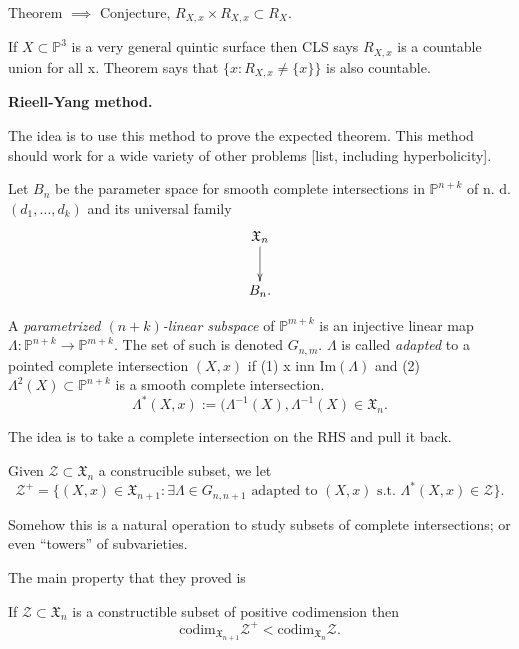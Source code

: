 Theorem $\implies $ Conjecture,
$R_{X,x} \times R_{X,x} \subset R_X$.

\begin{example}
\label{example-very-general-ci}
If $X \subset \mathbb{P}^3$ is a 
very general quintic surface then CLS says
$R_{X,x}$ is a countable union for all x.
Theorem says that $\{x: R_{X,x}\neq \{x\}\}$
is also countable.
\end{example}

\medskip\noindent
{\bf Rieell-Yang method.}

\noindent
The idea is to use this method to 
prove the expected theorem.
This method should work for a wide
variety of other problems [list, including
hyperbolicity].

Let $B_n$ be the parameter space
for smooth complete intersections
in $\mathbb{P}^{n+k}$ of n. d.
$(d_1,…,d_k)$ and its universal family
$$
\xymatrix{
\mathfrak{X}_n\ar[d]\\
B_n.
}
$$

\begin{definition}
\label{definition-parametrized-lin-subsp}
A {\it parametrized $(n+k)$-linear
subspace} of $\mathbb{P}^{m+k}$
is an injective linear map
$\Lambda: \mathbb{P}^{n+k} \to
\mathbb{P}^{m+k}$.
The set of such is denoted $G_{n,m}$.
$\Lambda$ is called
{\it adapted} to a pointed
complete intersection $(X,x)$
if (1) x inn $\text{Im}(\Lambda)$
and (2) $\Lambda^2(X) \subset
\mathbb{P}^{n+k}$ is a smooth complete
intersection.
$$
\Lambda^*(X,x):=
(\Lambda^{-1}(X),\Lambda^{-1}(X) \in
\mathfrak{X}_n.
$$
\end{definition}

\noindent
The idea is to take a complete intersection
on the RHS and pull it back.

\begin{definition}
\label{definition-constructible-subvars}
Given $\mathcal{Z} 
\subset \mathfrak{X}_n$
a construcible subset, we let
$$
\mathcal{Z}^{+} =
\{(X,x) \in \mathfrak{X}_{n+1}:
\exists \Lambda \in G_{n,n+1}
\text{ adapted to }(X,x)
\text{ s.t. }
\Lambda^*(X,x) \in \mathcal{Z}\}.
$$
\end{definition}
\noindent
Somehow this is a natural
operation to study subsets of complete
intersections; or even
``towers'' of subvarieties.

The main property that they proved is

\begin{theorem}[RY]
\label{theorem-ry}
If $\mathcal{Z} \subset \mathfrak{X}_n$
is a constructible subset of 
positive codimension
then
$$
\text{codim}_{\mathfrak{X}_{n+1}}
\mathcal{Z}^+
< \text{codim}_{\mathfrak{X}_n}\mathcal{Z}.
$$
\end{theorem}

